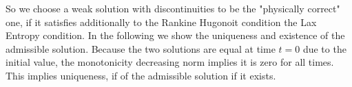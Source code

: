 \documentclass[A4,12pt,twoside]{book}
\begin{document}
So we choose a weak solution with discontinuities to be the "physically correct" one, if it satisfies additionally to the Rankine Hugonoit condition the Lax Entropy condition. In the following we show the uniqueness and existence of the admissible solution.
Because the two solutions are equal at time $t=0$ due to the initial value, the monotonicity decreasing norm implies it is zero for all times. This implies uniqueness, if of the admissible solution if it exists.
\end{document}
